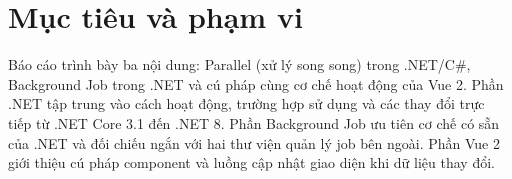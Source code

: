 \section*{Mục tiêu và phạm vi}

Báo cáo trình bày ba nội dung: Parallel (xử lý song song) trong .NET/C\#, Background Job trong
.NET và cú pháp cùng cơ chế hoạt động của Vue 2. Phần .NET tập trung vào cách hoạt
động, trường hợp sử dụng và các thay đổi trực tiếp từ .NET Core 3.1 đến .NET 8.
Phần Background Job ưu tiên cơ chế có sẵn của .NET và đối chiếu ngắn với hai thư viện
quản lý job bên ngoài. Phần Vue 2 giới thiệu cú pháp component và luồng cập nhật giao diện
khi dữ liệu thay đổi.
